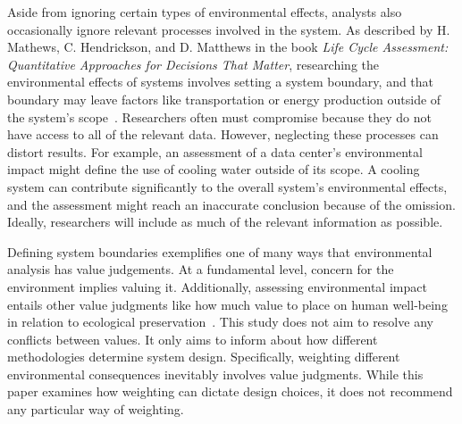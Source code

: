 \documentclass[final,journal,10pt,letterpaper,oneside,twocolumn,compsoc]%
{IEEEtran}
\begin{document}
Aside from ignoring certain types of environmental effects, analysts also
occasionally ignore relevant processes involved in the system. As described by
H. Mathews, C. Hendrickson, and D. Matthews in the book \textit{Life Cycle
Assessment: Quantitative Approaches for Decisions That Matter}, researching the
environmental effects of systems involves setting a system boundary, and that
boundary may leave factors like transportation or energy production outside of
the system's scope~\cite{textbook}. Researchers often must compromise because
they do not have access to all of the relevant data. However, neglecting
these processes can distort results. For example, an assessment of a data
center's environmental impact
might define the use of cooling water outside of its scope. A cooling system can
contribute significantly to the overall system's environmental effects, and the
assessment might reach an inaccurate conclusion because of the omission.
Ideally, researchers will include as much of the relevant information as
possible.

Defining system boundaries exemplifies one of many ways that environmental
analysis has value judgements. At a fundamental level, concern for the
environment
implies valuing it. Additionally, assessing environmental impact entails other
value
judgments like how much value to place on human well-being in relation to
ecological preservation~\cite{pre}. This study does not aim to resolve any
conflicts
between values. It only aims to inform about how different methodologies
determine
system design. Specifically, weighting different environmental consequences
inevitably involves value judgments. While this paper examines
how weighting can dictate design choices, it does not recommend any particular
way of weighting.
\end{document}
